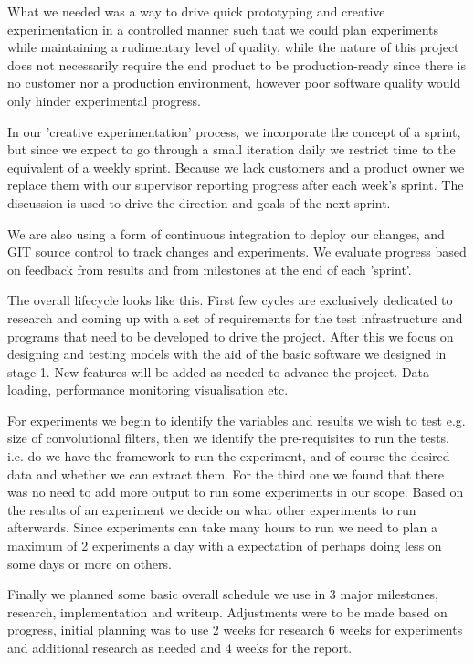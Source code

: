 What we needed was a way to drive quick prototyping and creative experimentation in a controlled manner such that we could plan experiments while maintaining a rudimentary level of quality, while the nature of this project does not necessarily require the end product to be production-ready since there is no customer nor a production environment, however poor software quality would only hinder experimental progress.

In our 'creative experimentation' process, we incorporate the concept of a sprint, but since we expect to go through a small iteration daily we restrict time to the equivalent of a weekly sprint. Because we lack customers and a product owner we replace them with our supervisor reporting progress after each week's sprint. The discussion is used to drive the direction and goals of the next sprint.

We are also using a form of continuous integration to deploy our changes, and GIT source control to track changes and experiments. We evaluate progress based on feedback from results and from milestones at the end of each 'sprint'.

The overall lifecycle looks like this. First few cycles are exclusively dedicated to research and coming up with a set of requirements for the test infrastructure and programs that need to be developed to drive the project. After this we focus on designing and testing models with the aid of the basic software we designed in stage 1. New features will be added as needed to advance the project. Data loading, performance monitoring visualisation etc.

For experiments we begin to identify the variables and results we wish to test e.g. size of convolutional filters, then we identify the pre-requisites to run the tests. i.e. do we have the framework to run the experiment, and of course the desired data and whether we can extract them. For the third one we found that there was no need to add more output to run some experiments in our scope. Based on the results of an experiment we decide on what other experiments to run afterwards. Since experiments can take many hours to run we need to plan a maximum of 2 experiments a day with a expectation of perhaps doing less on some days or more on others.

Finally we planned some basic overall schedule we use in 3 major milestones, research, implementation and writeup. Adjustments were to be made based on progress, initial planning was to use 2 weeks for research 6 weeks for experiments and additional research as needed and 4 weeks for the report.